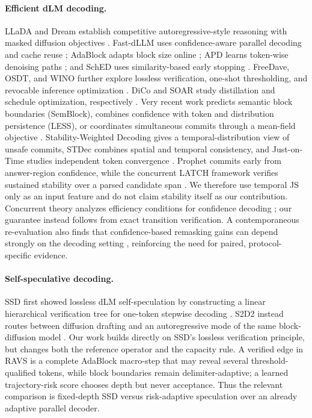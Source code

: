 \documentclass{article}
\newcommand{\method}{\textsc{RAVS}\xspace}
\begin{document}
\paragraph{Efficient dLM decoding.}
LLaDA and Dream establish competitive autoregressive-style reasoning with masked diffusion
objectives \citep{nie2025llada,ye2025dream}. Fast-dLLM uses confidence-aware parallel decoding
and cache reuse \citep{wu2025fastdllm}; AdaBlock adapts block size online
\citep{lu2026adablock}; APD learns token-wise denoising paths \citep{israel2025apd}; and SchED
uses similarity-based early stopping \citep{mohamed2025sched}. FreeDave, OSDT, and WINO
further explore lossless verification, one-shot thresholding, and revocable inference
optimization \citep{liu2026freedave,zhou2026osdt,wang2026wino}. DiCo and SOAR study
distillation and schedule optimization, respectively \citep{luo2026dico,cao2026soar}.
Very recent work predicts semantic block boundaries (SemBlock), combines confidence with
token and distribution persistence (LESS), or coordinates simultaneous commits through a
mean-field objective \citep{song2026semblock,mohamed2026less,zoabi2026meanfield}.
Stability-Weighted Decoding gives a temporal-distribution view of unsafe commits, STDec combines
spatial and temporal consistency, and Just-on-Time studies independent token convergence
\citep{wu2026swd,chen2026stdec,kohut2026jit}. Prophet commits early from answer-region confidence,
while the concurrent LATCH framework verifies sustained stability over a parsed candidate span
\citep{li2025prophet,lee2026latch}. We therefore use temporal JS only as an input feature and do
not claim stability itself as our contribution. Concurrent theory analyzes efficiency
conditions for confidence decoding \citep{cai2026confidence}; our guarantee instead follows from
exact transition verification. A contemporaneous
re-evaluation also finds that confidence-based remasking gains can depend strongly on the
decoding setting \citep{frkovic2026reevaluating}, reinforcing the need for paired,
protocol-specific evidence.

\paragraph{Self-speculative decoding.}
SSD first showed lossless dLM self-speculation by constructing a linear hierarchical verification
tree for one-token stepwise decoding \citep{gao2025ssd}. S2D2 instead routes between diffusion
drafting and an autoregressive mode of the same block-diffusion model \citep{han2026s2d2}.
Our work builds directly on SSD's lossless verification principle, but changes both the reference
operator and the capacity rule. A verified edge in \method is a complete AdaBlock macro-step that
may reveal several threshold-qualified tokens, while block boundaries remain delimiter-adaptive;
a learned trajectory-risk score chooses depth but never acceptance. Thus the relevant comparison
is fixed-depth SSD versus risk-adaptive speculation over an already adaptive parallel decoder.
\end{document}
